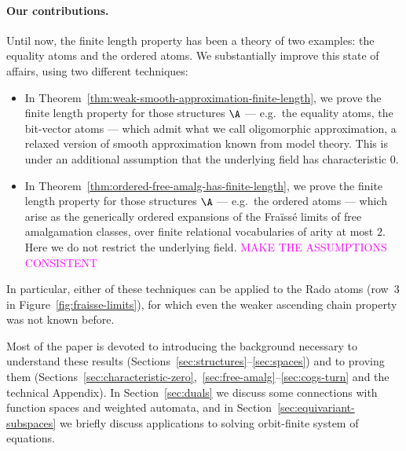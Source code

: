 \paragraph*{Our contributions.} 
Until now, the finite length property has been a theory of two examples: the equality atoms and the ordered atoms. 
We substantially improve this state of affairs, using two different techniques:
\begin{itemize}
    \item 
    In Theorem~\ref{thm:weak-smooth-approximation-finite-length}, we prove the finite length property for those structures $\A$ --- 
    e.g.~the equality atoms, the bit-vector atoms --- 
    which admit what we call oligomorphic approximation, a relaxed version of smooth approximation known from model theory. This is under an additional assumption that the underlying field has characteristic $0$.

    \item 
    In Theorem~\ref{thm:ordered-free-amalg-has-finite-length}, we prove the finite length property for those structures $\A$ --- 
    e.g.~the ordered atoms --- 
    which arise as the generically ordered expansions of the Fraïssé limits of free amalgamation classes, over finite relational vocabularies of arity at most $2$. 
    Here we do not restrict the underlying field.
    \textcolor{magenta}{MAKE THE ASSUMPTIONS CONSISTENT}
\end{itemize}
In particular, either of these techniques can be applied to the Rado atoms (row~3 in Figure~\ref{fig:fraisse-limits}), for which even the weaker ascending chain property was not known before.

Most of the paper is devoted to introducing the background necessary to understand these results (Sections~\ref{sec:structures}--\ref{sec:spaces}) and to proving them (Sections~\ref{sec:characteristic-zero},~\ref{sec:free-amalg}--\ref{sec:cogs-turn} and the technical Appendix). 
In Section~\ref{sec:duals} we discuss some connections with function spaces and weighted automata, and in Section~\ref{sec:equivariant-subspaces} we  briefly discuss  applications to solving orbit-finite system of equations.
